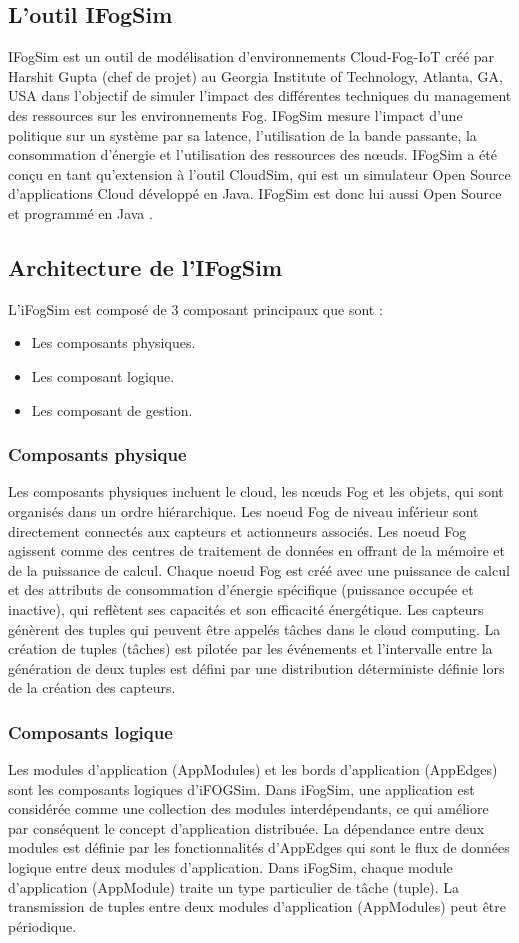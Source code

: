 \subsection{L’outil IFogSim}
IFogSim est un outil de modélisation d’environnements Cloud-Fog-IoT créé par
Harshit Gupta (chef de projet) au Georgia Institute of Technology, Atlanta, GA, USA dans l’objectif de simuler l’impact des différentes techniques du management des ressources sur les environnements Fog. IFogSim mesure l’impact d’une politique sur un système par sa latence, l’utilisation de la bande passante, la consommation d’énergie et l’utilisation des ressources des nœuds. IFogSim a été conçu en tant qu’extension à l’outil CloudSim, qui est un simulateur Open Source d’applications Cloud développé en Java. IFogSim est donc lui aussi Open Source et programmé en Java .
\subsection{Architecture de l’IFogSim}
L’iFogSim est composé de 3 composant principaux que sont : 
\begin{itemize}
    \item Les composants physiques.
    \item Les composant logique.
    \item Les composant de gestion.
\end{itemize}
\subsubsection{Composants physique}
Les composants physiques incluent le cloud, les nœuds Fog et les objets, qui sont organisés dans un ordre hiérarchique. Les noeud Fog de niveau inférieur sont directement connectés aux capteurs et actionneurs associés. Les noeud Fog agissent comme des centres de traitement de données en offrant de la mémoire et de la puissance de calcul. Chaque noeud Fog est créé avec une puissance de calcul et des attributs de consommation d'énergie spécifique (puissance occupée et inactive), qui reflètent ses capacités et son efficacité énergétique. Les capteurs génèrent des tuples qui peuvent être appelés tâches dans le cloud computing. La création de tuples (tâches) est pilotée par les événements et l'intervalle entre la génération de deux tuples est défini par une distribution déterministe définie lors de la création des capteurs.
\subsubsection{Composants logique}
Les modules d'application (AppModules) et les bords d'application (AppEdges) sont les composants logiques d'iFOGSim. Dans iFogSim, une application est considérée comme une collection des modules interdépendants, ce qui améliore par conséquent le concept d'application distribuée. La dépendance entre deux modules est définie par les fonctionnalités d'AppEdges qui sont le flux de données logique entre deux modules d’application. Dans iFogSim, chaque module d’application (AppModule) traite un type particulier de tâche (tuple). La transmission de tuples entre deux modules d’application (AppModules) peut être périodique.
